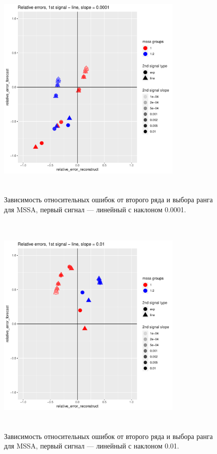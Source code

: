 \documentclass[specialist, substylefile = spbureport.rtx,
    subf,href,colorlinks=true, 12pt]{disser}
\begin{document}
        \begin{figure}[h]
            \centering
            \includegraphics[height=11cm, width=0.8\textwidth]{experiment_3_mssa2.pdf}
            \caption{Зависимость относительных ошибок от второго ряда и выбора ранга для MSSA, первый сигнал --- линейный с наклоном 0.0001.}
            \label{fig:exp3_mssa2}
        \end{figure}

        \begin{figure}[h]
            \centering
            \includegraphics[height=11cm, width=0.8\textwidth]{experiment_3_mssa1.pdf}
            \caption{Зависимость относительных ошибок от второго ряда и выбора ранга для MSSA, первый сигнал --- линейный с наклоном 0.01.}
            \label{fig:exp3_mssa1}
        \end{figure}
\end{document}
